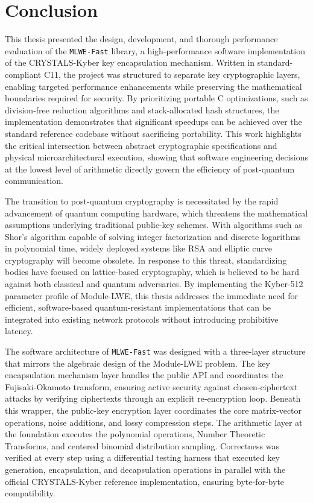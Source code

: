 \chapter*{Conclusion}

This thesis presented the design, development, and thorough performance evaluation of the \texttt{MLWE-Fast} library, a high-performance software implementation of the CRYSTALS-Kyber key encapsulation mechanism. Written in standard-compliant C11, the project was structured to separate key cryptographic layers, enabling targeted performance enhancements while preserving the mathematical boundaries required for security. By prioritizing portable C optimizations, such as division-free reduction algorithms and stack-allocated hash structures, the implementation demonstrates that significant speedups can be achieved over the standard reference codebase without sacrificing portability. This work highlights the critical intersection between abstract cryptographic specifications and physical microarchitectural execution, showing that software engineering decisions at the lowest level of arithmetic directly govern the efficiency of post-quantum communication.

The transition to post-quantum cryptography is necessitated by the rapid advancement of quantum computing hardware, which threatens the mathematical assumptions underlying traditional public-key schemes. With algorithms such as Shor's algorithm capable of solving integer factorization and discrete logarithms in polynomial time, widely deployed systems like RSA and elliptic curve cryptography will become obsolete. In response to this threat, standardizing bodies have focused on lattice-based cryptography, which is believed to be hard against both classical and quantum adversaries. By implementing the Kyber-512 parameter profile of Module-LWE, this thesis addresses the immediate need for efficient, software-based quantum-resistant implementations that can be integrated into existing network protocols without introducing prohibitive latency.

The software architecture of \texttt{MLWE-Fast} was designed with a three-layer structure that mirrors the algebraic design of the Module-LWE problem. The key encapsulation mechanism layer handles the public API and coordinates the Fujisaki-Okamoto transform, ensuring active security against chosen-ciphertext attacks by verifying ciphertexts through an explicit re-encryption loop. Beneath this wrapper, the public-key encryption layer coordinates the core matrix-vector operations, noise additions, and lossy compression steps. The arithmetic layer at the foundation executes the polynomial operations, Number Theoretic Transforms, and centered binomial distribution sampling. Correctness was verified at every step using a differential testing harness that executed key generation, encapsulation, and decapsulation operations in parallel with the official CRYSTALS-Kyber reference implementation, ensuring byte-for-byte compatibility.

